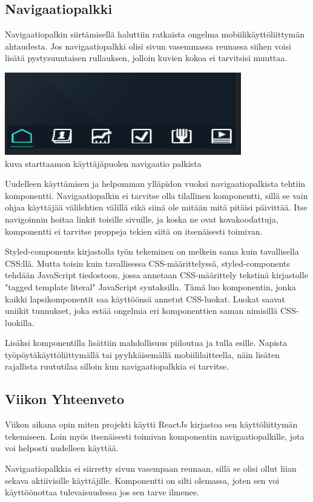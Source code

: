 \subsection*{ Navigaatiopalkki }

Navigaatiopalkin siirtämisellä haluttiin ratkaista ongelma mobiilikäyttöliittymän ahtaudesta. Jos navigaatiopalkki olisi sivun vasemmassa reunassa siihen voisi lisätä pystysuuntaisen rullauksen, jolloin kuvien kokoa ei tarvitsisi muuttaa.
\medskip



\includegraphics{src/public/starttaamohomenavbar.png} \\
kuva starttaamon käyttäjäpuolen navigaatio palkista \medskip

Uudelleen käyttämisen ja helpomman ylläpidon vuoksi navigaatiopalkista tehtiin komponentti.
Navigaatiopalkin ei tarvitse olla tilallinen komponentti, sillä se vain ohjaa käyttäjää välilehtien välillä eikä siinä ole mitään mitä pitäisi päivittää.
Itse navigoinnin hoitaa linkit toisille sivuille, ja koska ne ovat kovakoodattuja, komponentti ei tarvitse proppeja tekien siitä on itsenäisesti toimivan. 
\medskip


Styled-components kirjastolla työn tekeminen on melkein sama kuin tavallisella CSS:llä. Mutta toisin kuin tavallisessa CSS-määrittelyssä, styled-components tehdään JavaScript tiedostoon, jossa annetaan CSS-määrittely tekstinä kirjastolle "tagged template literal"{} JavaScript syntaksilla.
Tämä luo komponentin, jonka kaikki lapsikomponentit saa käyttöönsä annetut CSS-luokat. Luokat saavat uniikit tunnukset, joka estää ongelmia eri komponenttien saman nimisillä CSS-luokilla.
\medskip

Lisäksi komponentilla lisättiin mahdollisuus piiloutua ja tulla esille. Napista työpöytäkäyttöliittymällä tai pyyhkäisemällä mobiililaitteella, näin lisäten rajallista ruututilaa silloin kun navigaatiopalkkia ei tarvitse.\medskip









\subsection*{Viikon Yhteenveto}

Viikon aikana opin miten projekti käytti ReactJs kirjastoa sen käyttöliittymän tekemiseen. 
Loin myös itsenäisesti toimivan komponentin navigaatiopalkille, jota voi helposti uudelleen käyttää.\medskip

Navigaatiopalkkia ei siirretty sivun vasempaan reunaan, sillä se olisi ollut liian sekava aktiivisille käyttäjille. 
Komponentti on silti olemassa, joten sen voi käyttöönottaa tulevaisuudessa jos sen tarve ilmenee.\medskip
